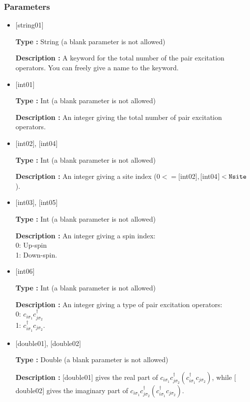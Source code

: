\subsubsection{Parameters}
 \begin{itemize}

   \item  $[$string01$]$
   
    {\bf Type :} String (a blank parameter is not allowed)

   {\bf Description :} A keyword for the total number of the pair excitation operators. You can freely give a name to the keyword.

   \item  $[$int01$]$
   
    {\bf Type :} Int (a blank parameter is not allowed)

   {\bf Description :} An integer giving the total number of pair excitation operators.

  \item  $[$int02$]$, $[$int04$]$

 {\bf Type :} Int (a blank parameter is not allowed)

{\bf Description :} An integer giving a site index ($0<= [$int02$], [$int04$]<\verb|Nsite|$).
 
 
  \item  $[$int03$]$, $[$int05$]$

 {\bf Type :} Int (a blank parameter is not allowed)

{\bf Description :} 
An integer giving a spin index:\\
0: Up-spin\\
1: Down-spin.

\item  $[$int06$]$

 {\bf Type :} Int (a blank parameter is not allowed)

{\bf Description :} 
An integer giving a type of pair excitation operators:\\
0: $ c_{i\sigma_1}c_{j\sigma_2}^{\dagger}$\\
1: $ c_{i\sigma_1}^{\dagger}c_{j\sigma_2}$.

\item  $[$double01$]$, $[$double02$]$

 {\bf Type :} Double (a blank parameter is not allowed)

{\bf Description :} $[$double01$]$ gives the real part of $ c_{i\sigma_1}c_{j\sigma_2}^{\dagger} ( c_{i\sigma_1}^{\dagger}c_{j\sigma_2})$, while $[$double02$]$ gives the imaginary part of $ c_{i\sigma_1}c_{j\sigma_2}^{\dagger} ( c_{i\sigma_1}^{\dagger}c_{j\sigma_2})$.

\end{itemize}

